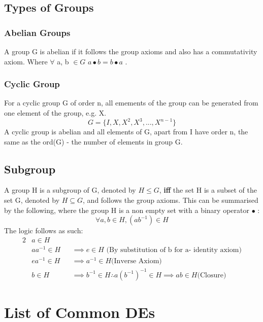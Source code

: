 \documentclass{report}
\begin{document}
\section*{Types of Groups}
\large{
	\subsection*{Abelian Groups}
		A group G is abelian if it follows the group axioms and also has a commutativity axiom. Where $\forall$ a, b $\in G$ $a \bullet b = b \bullet a$ .  
	\subsection*{Cyclic Group}
		For a cyclic group G of order n, all emements of the group can be generated from one element of the group, e.g. X.
		\begin{equation*}
			G = \{I, X, X^2, X^3, ... , X^{n-1}\}
		\end{equation*}
		A cyclic group is abelian and all elements of G, apart from I have order n, the same as the ord(G) - the number of elements in group G.
	\section*{Subgroup}
		A group H is a subgroup of G, denoted by $H \leq G$, \textbf{iff} the set H is a subset of the set G, denoted by $H \subseteq G$, and follows the group axioms.
		This can be summarised by the following, where the group H is a non empty set with a binary operator $\bullet$ : 
		\begin{equation*}
			\forall a, b \in H, (ab^{-1})\in H	
		\end{equation*}
		The logic follows as such:
		\begin{alignat*}{2}
			& a \in H \\
			&aa^{-1}\in H &&\implies e \in H \text{ (By substitution of b for a- identity axiom)} \\
			&ea^{-1}\in H &&\implies a^{-1} \in H \text{(Inverse Axiom)}\\ 
			&b \in H &&\implies b^{-1} \in H \therefore a(b^{-1})^{-1} \in H \implies ab \in H \text{(Closure)}
		\end{alignat*}
}

\chapter*{List of Common DEs} 
\vspace{10.0mm}
\end{document}
